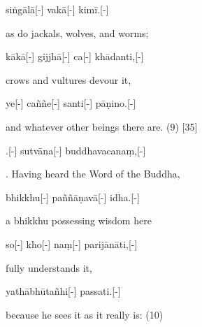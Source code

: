 \begin{samepage}
\begingl[glneveryline={\PaliGlossA,\PaliGlossB}]
siṅgālā[-] vakā[-] kimī.[-]
\endgl
\nopagebreak
\linespread{0.5}
\begin{spacin}{0.2}
{\PaliGlossFT as do jackals, wolves, and worms;}
\end{spacin}
\vskip 12pt
\end{samepage}
\begin{samepage}
\begingl[glneveryline={\PaliGlossA,\PaliGlossB}]
kākā[-] gijjhā[-] ca[-] khādanti,[-]
\endgl
\nopagebreak
\linespread{0.5}
\begin{spacin}{0.2}
{\PaliGlossFT crows and vultures devour it,}
\end{spacin}
\vskip 12pt
\end{samepage}
\begin{samepage}
\begingl[glneveryline={\PaliGlossA,\PaliGlossB}]
ye[-] caññe[-] santi[-] pāṇino.[-]
\endgl
\nopagebreak
\linespread{0.5}
\begin{spacin}{0.2}
{\PaliGlossFT and whatever other beings there are. (9) [35]}
\end{spacin}
\vskip 12pt
\end{samepage}
\vskip 0.2in
\begin{samepage}
.[-] sutvāna[-] buddhavacanaṃ,[-]
\endgl
\nopagebreak
\linespread{0.5}
\begin{spacin}{0.2}
{. Having heard the Word of the Buddha,}
\end{spacin}
\vskip 12pt
\end{samepage}
\begin{samepage}
\begingl[glneveryline={\PaliGlossA,\PaliGlossB}]
bhikkhu[-] paññāṇavā[-] idha.[-]
\endgl
\nopagebreak
\linespread{0.5}
\begin{spacin}{0.2}
{\PaliGlossFT a bhikkhu possessing wisdom here}
\end{spacin}
\vskip 12pt
\end{samepage}
\begin{samepage}
\begingl[glneveryline={\PaliGlossA,\PaliGlossB}]
so[-] kho[-] naṃ[-] parijānāti,[-]
\endgl
\nopagebreak
\linespread{0.5}
\begin{spacin}{0.2}
{\PaliGlossFT fully understands it,}
\end{spacin}
\vskip 12pt
\end{samepage}
\begin{samepage}
\begingl[glneveryline={\PaliGlossA,\PaliGlossB}]
yathābhūtañhi[-] passati.[-]
\endgl
\nopagebreak
\linespread{0.5}
\begin{spacin}{0.2}
{\PaliGlossFT because he sees it as it really is: (10)}
\end{spacin}
\vskip 12pt
\end{samepage}
